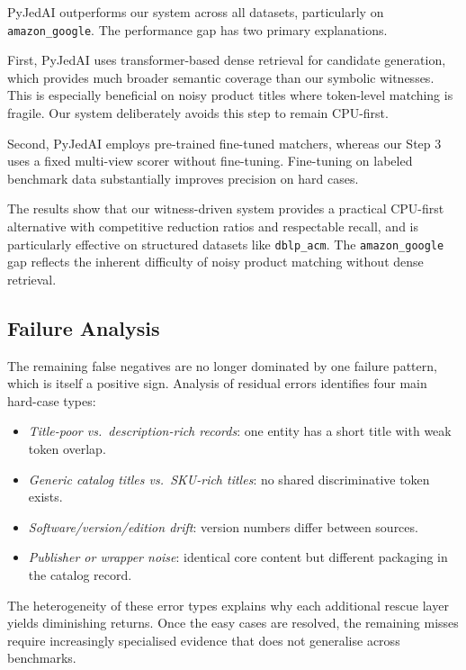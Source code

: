 \documentclass[10pt,twocolumn]{article}
\begin{document}
PyJedAI outperforms our system across all datasets, particularly on
\texttt{amazon\_google}. The performance gap has two primary explanations.

First, PyJedAI uses transformer-based dense retrieval for candidate
generation, which provides much broader semantic coverage than our symbolic
witnesses. This is especially beneficial on noisy product titles where
token-level matching is fragile. Our system deliberately avoids this step
to remain CPU-first.

Second, PyJedAI employs pre-trained fine-tuned matchers, whereas our Step
3 uses a fixed multi-view scorer without fine-tuning. Fine-tuning on
labeled benchmark data substantially improves precision on hard cases.

The results show that our witness-driven system provides a practical CPU-first
alternative with competitive reduction ratios and respectable recall, and is
particularly effective on structured datasets like \texttt{dblp\_acm}. The
\texttt{amazon\_google} gap reflects the inherent difficulty of noisy
product matching without dense retrieval.

\subsection{Failure Analysis}

The remaining false negatives are no longer dominated by one failure pattern,
which is itself a positive sign. Analysis of residual errors identifies four
main hard-case types:
\begin{itemize}
  \item \emph{Title-poor vs.\ description-rich records}: one entity has
    a short title with weak token overlap.
  \item \emph{Generic catalog titles vs.\ SKU-rich titles}: no shared
    discriminative token exists.
  \item \emph{Software/version/edition drift}: version numbers differ
    between sources.
  \item \emph{Publisher or wrapper noise}: identical core content but
    different packaging in the catalog record.
\end{itemize}

The heterogeneity of these error types explains why each additional rescue
layer yields diminishing returns. Once the easy cases are resolved, the
remaining misses require increasingly specialised evidence that does not
generalise across benchmarks.
\end{document}

